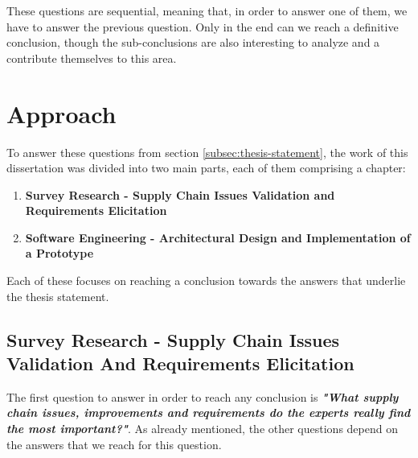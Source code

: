 
These questions are sequential, meaning that, in order to answer one of them, we have to answer the previous question. Only in the end can we reach a definitive conclusion, though the sub-conclusions are also interesting to analyze and a contribute themselves to this area.


\section{Approach}


To answer these questions from section \ref{subsec:thesis-statement}, the work of this dissertation was divided into two main parts, each of them comprising a chapter:
\begin{enumerate}
\item \textbf{Survey Research - Supply Chain Issues Validation and Requirements Elicitation}
\item \textbf{Software Engineering - Architectural Design and Implementation of a Prototype}
\end{enumerate}


Each of these focuses on reaching a conclusion towards the answers that underlie the thesis statement.

\subsection{Survey Research - Supply Chain Issues Validation And Requirements Elicitation}
\label{sec:survey-approach}
The first question to answer in order to reach any conclusion is \textbf{\textit{"What supply chain issues, improvements and requirements do the experts really find the most important?"}}. As already mentioned, the other questions depend on the answers that we reach for this question.

